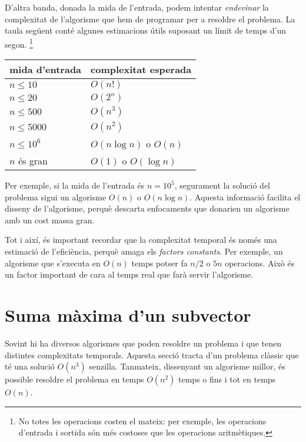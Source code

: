 D'altra banda, donada la mida de l'entrada,
podem intentar \emph{endevinar}
la complexitat de l'algorisme que hem de programar
per a resoldre el problema.
La taula següent conté algunes estimacions útils
suposant un límit de temps d'un segon. \footnote{No totes les operacions
costen el mateix: per exemple, les operacions d'entrada i sortida
són més costoses que les operacions aritmètiques.}

\begin{centre}
\begin{tabular}{ll}
mida d'entrada & complexitat esperada \\
\hline
$n \le 10$ & $O(n!)$ \\
$n \le 20$ & $O(2^n)$ \\
$n \le 500$ & $O(n^3)$ \\
$n \le 5000$ & $O(n^2)$ \\
$n \le 10^6$ & $O(n \log n)$ o $O(n)$ \\
$n$ és gran & $O(1)$ o $O(\log n)$ \\
\end{tabular}
\end{centre}

Per exemple, si la mida de l'entrada és $n=10^5$,
segurament la solució del problema sigui un
algorisme $O(n)$ o $O(n \log n)$.
Aquesta informació facilita el disseny de l'algorisme,
perquè descarta enfocaments que donarien
un algorisme amb un cost massa gran.


Tot i així, és important recordar que
la complexitat temporal és només una estimació de l'eficiència,
perquè amaga els \emph{factors constants}.
Per exemple, un algorisme que s'executa en $O(n)$ temps
potser fa $n/2$ o $5n$ operacions.
Això és un factor important de cara al temps
real que farà servir l'algorisme.

\section{Suma màxima d'un subvector}


Sovint hi ha diversos algorismes
que poden resoldre un problema i que tenen distintes
complexitats temporals.
Aquesta secció tracta d'un problema clàssic que
té una solució $O(n^3)$ senzilla.
Tanmateix, dissenyant un algorisme millor, 
és possible resoldre el problema en temps $O(n^2)$
temps o fins i tot en temps $O(n)$.

